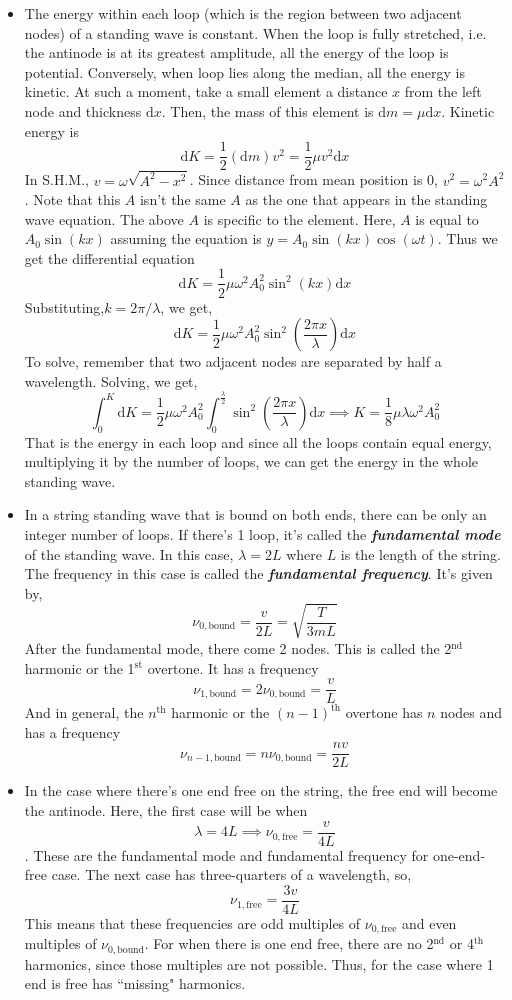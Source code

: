 \documentclass{scrartcl}
\begin{document}
\begin{itemize}
        \item The energy within each loop (which is the region between two adjacent nodes) of a standing wave is constant. When the loop is fully stretched, i.e. the antinode is at its greatest amplitude, all the energy of the loop is potential. Conversely, when loop lies along the median, all the energy is kinetic. At such a moment, take a small element a distance $x$ from the left node and thickness $\mathrm dx$. Then, the mass of this element is $\mathrm dm=\mu\mathrm dx$. Kinetic energy is \[\mathrm dK=\frac12\left(\mathrm dm\right)v^2=\frac12\mu v^2\mathrm dx\] In S.H.M., $v=\omega\sqrt{A^2-x^2}$. Since distance from mean position is 0, $v^2=\omega^2A^2$. Note that this $A$  isn't the same $A$ as the one that appears in the standing wave equation. The above $A$ is specific to the element. Here, $A$ is equal to $A_0\sin(kx)$ assuming the equation is $y=A_0\sin(kx)\cos(\omega t)$. Thus we get the differential equation \[\mathrm dK=\frac12\mu\omega^2A_0^2\sin^2(kx)\mathrm dx\] Substituting,$k=2\pi/\lambda$, we get, \[\mathrm dK=\frac12\mu\omega^2A_0^2\sin^2\left(\frac{2\pi x}{\lambda}\right)\mathrm dx\] To solve, remember that two adjacent nodes are separated by half a wavelength. Solving, we get, \[\int_0^K\mathrm dK=\frac12\mu\omega^2 A_0^2\int_0^\frac\lambda2\sin^2\left(\frac{2\pi x}{\lambda}\right)\mathrm dx\implies\boxed{K=\frac18\mu\lambda\omega^2A_0^2}\] That is the energy in each loop and since all the loops contain equal energy, multiplying it by the number of loops, we can get the energy in the whole standing wave.
        \item In a string standing wave that is bound on both ends, there can be only an integer number of loops. If there's 1 loop, it's called the \textbf{\textit{fundamental mode}} of the standing wave. In this case, $\lambda=2L$ where $L$ is the length of the string. The frequency in this case is called the \textbf{\textit{fundamental frequency}}. It's given by, \[\nu_{0,\text{bound}}=\frac v{2L}=\sqrt{\frac T{3mL}}\] After the fundamental mode, there come 2 nodes. This is called the 2$^\text{nd}$ harmonic or the 1$^\text{st}$ overtone. It has a frequency \[\nu_{1,\text{bound}}=2\nu_{0,\text{bound}}=\frac vL\] And in general, the $n^\text{th}$ harmonic or the $(n-1)^\text{th}$ overtone has $n$ nodes and has a frequency \[\boxed{\nu_{n-1,\text{bound}}=n\nu_{0,\text{bound}}=\frac{nv}{2L}}\]
        \item In the case where there's one end free on the string, the free end will become the antinode. Here, the first case will be when \[\lambda=4L\implies\nu_{0,\text{free}}=\frac v{4L}\]. These are the fundamental mode and fundamental frequency for one-end-free case. The next case has three-quarters of a wavelength, so, \[\nu_{1,\text{free}}=\frac{3v}{4L}\] This means that these frequencies are odd multiples of $\nu_{0,\text{free}}$ and even multiples of $\nu_{0,\text{bound}}$. For when there is one end free, there are no 2$^\text{nd}$ or 4$^\text{th}$ harmonics, since those multiples are not possible. Thus, for the case where 1 end is free has ``missing" harmonics.

\end{itemize}
\end{document}
